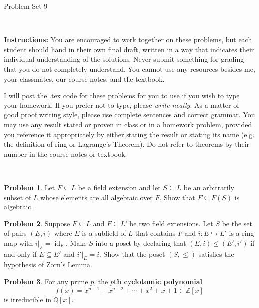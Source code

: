 \documentclass[11pt]{article}
\title{}
\date{\vspace{-0.5in}}
\DeclareMathOperator{\id}{id}
\newcommand{\Q}{\mathbb{Q}}
\newcommand{\Z}{\mathbb{Z}}
\theoremstyle{definition}
\newtheorem{problem}{Problem}
\begin{document}
\thispagestyle{fancy}
\pagestyle{fancy}

\vspace{3em}

\begin{center}
	{\LARGE Problem Set 9}
\end{center}

\

\noindent
{\bf Instructions:}
You are encouraged to work together on these problems, but each student should hand in their own final draft, written in a way that indicates their individual understanding of the solutions. Never submit something for grading that you do not completely understand. You cannot use any resources besides me, your classmates, our course notes, and the textbook.


I will post the .tex code for these problems for you to use if you wish to type your homework. If you prefer not to type, please  {\em write neatly}. As a matter of good proof writing style, please use complete sentences and correct grammar. You may use any result  stated or proven in class or in a homework problem, provided you reference it appropriately by either stating the result or stating its name (e.g. the definition of ring or Lagrange's Theorem). Do not refer to theorems by their number in the course notes or textbook.


\



\begin{problem}
	Let $F \subseteq L$ be a field extension and let $S \subseteq L$ be an arbitrarily subset of $L$ whose elements are all algebraic over $F$. Show that $F \subseteq F(S)$ is algebraic.
\end{problem}



\begin{problem}
Suppose $F \subseteq L$ and $F \subseteq L'$ be two field extensions. Let $S$ be the set of pairs $(E,i)$ where $E$ is a subfield of $L$ that contains $F$ and $i: E \hookrightarrow L'$ is a ring map with $i|_F = \id_F$. Make $S$ into a poset by declaring that $(E,i) \leq (E',i')$ if and only if $E \subseteq E'$ and $i'|_E = i$. Show that the poset $(S, \leq)$ satisfies the hypothesis of Zorn's Lemma.
\end{problem}



\begin{problem} 
For any prime $p$, the {\bf $p$th cyclotomic polynomial}
$$f(x) = x^{p-1} + x^{p-2} + \cdots + x^2 + x + 1 \in \Z[x]$$
is irreducible in $\Q[x]$.
\end{problem}
\end{document}
